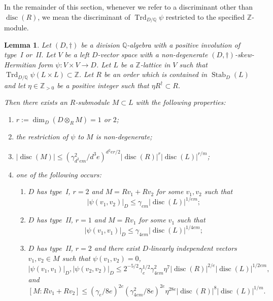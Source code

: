 \documentclass[11pt]{article}
\numberwithin{equation}{section}
\newenvironment{enumeratei}
{\bgroup\def\theenumi{\roman{enumi}}\def\theenumii{\alph{enumii}}\begin{enumerate}}
{\end{enumerate}\egroup}
\newcommand{\bQ}{\mathbb{Q}}
\newcommand{\bZ}{\mathbb{Z}}
\DeclareMathOperator{\disc}{disc}
\DeclareMathOperator{\Stab}{Stab}
\DeclareMathOperator{\Trd}{Trd}
\newcommand{\abs}[1]{\lvert #1 \rvert}
\newtheorem{lemma}{Lemma}[section]
\begin{document}
In the remainder of this section, whenever we refer to a discriminant other than $\disc(R)$, we mean the discriminant of $\Trd_{D/\bQ} \psi$ restricted to the specified $\bZ$-module.

\begin{lemma} \label{pre-induction}
Let $(D,\dag)$ be a division $\bQ$-algebra with a positive involution of type~I or~II.
Let $V$ be a left $D$-vector space with a non-degenerate $(D,\dag)$-skew-Hermitian form $\psi \colon V \times V \to D$.
Let $L$ be a $\bZ$-lattice in $V$ such that $\Trd_{D/\bQ} \psi(L \times L) \subset \bZ$.
Let $R$ be an order which is contained in $\Stab_D(L)$ and let $\eta \in \bZ_{>0}$ be a positive integer such that $\eta R^\dag \subset R$.

Then there exists an $R$-submodule $M \subset L$ with the following properties:
\begin{enumeratei}
\item\label{pre-inductioni} $r := \dim_D(D \otimes_R M) = 1$ or $2$;
\item\label{pre-inductionii} the restriction of $\psi$ to $M$ is non-degenerate;
\item\label{pre-inductioniii} $\abs{\disc(M)} \leq (\gamma_{d^2em}^2/d^3e)^{d^2er/2} \abs{\disc(R)}^r \abs{\disc(L)}^{r/m}$;
\item\label{pre-inductioniv} one of the following occurs:
\begin{enumerate}
\item $D$ has type~I, $r=2$ and $M = Rv_1 + Rv_2$ for some $v_1, v_2$ such that\vspace*{-3pt}
\[
\abs{\psi(v_1, v_2)}_D \leq \gamma_{em} \abs{\disc(L)}^{1/em};
\]
\item $D$ has type~II, $r=1$ and $M = Rv_1$ for some $v_1$ such that\vspace*{-3pt}
\[
\abs{\psi(v_1, v_1)}_D \leq \gamma_{4em} \abs{\disc(L)}^{1/4em};
\]
\item $D$ has type~II, $r=2$ and there exist $D$-linearly independent vectors $v_1, v_2 \in M$ such that $\psi(v_1, v_2) = 0$,\vspace*{-3pt}\enlargethispage{\baselineskip}
\[
\abs{\psi(v_1, v_1)}_D, \abs{\psi(v_2, v_2)}_D \leq 2^{-5/2} \gamma_e^{1/2} \gamma_{4em}^2 \eta^7 \abs{\disc(R)}^{2/e} \abs{\disc(L)}^{1/2em},
\]
and\vspace*{-5pt}
\[
[M:Rv_1 + Rv_2] \leq (\gamma_e/8e)^{2e} (\gamma_{4em}^2/8e)^{2e} \eta^{28e} \abs{\disc(R)}^8 \abs{\disc(L)}^{1/m}.
\]
\end{enumerate}
\end{enumeratei}
\end{lemma}
\end{document}
